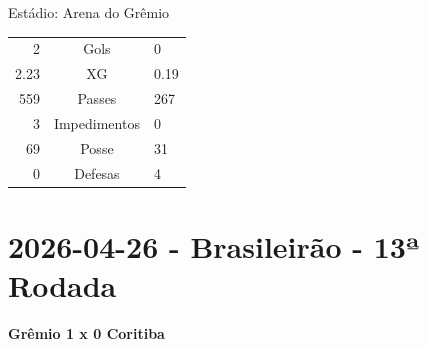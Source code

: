 \documentclass[11pt]{article}
\newcommand{\teamjersey}{}
\begin{document}
\begin{minipage}{0.3\textwidth}
Estádio: Arena do Grêmio\\
\begin{tabular}{rcl}
2 & Gols & 0 \\
2.23 & XG & 0.19 \\
559 & Passes & 267 \\
3 & Impedimentos & 0 \\
69 & Posse & 31 \\
0 & Defesas & 4 \\
\end{tabular}
\end{minipage}
\newpage
\section*{2026-04-26 - Brasileirão - 13ª Rodada}
\textbf{Grêmio 1 x 0 Coritiba}\\
\vspace{0.5cm}
\renewcommand{\teamjersey}{../assets/camisa/costas1.png}
\end{document}
